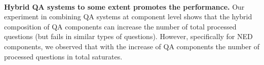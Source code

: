\documentclass[sigconf,edbt]{acmart-edbt2019}
\begin{document}
~\\
\textbf{Hybrid QA systems to some extent promotes the performance.}
Our experiment in combining QA systems at component level shows that the hybrid composition of QA components can increase the number of total processed questions (but fails in similar types of questions). However, specifically for NED components, we observed that with the increase of QA components the number of processed questions in total saturates.
~\\
\end{document}
